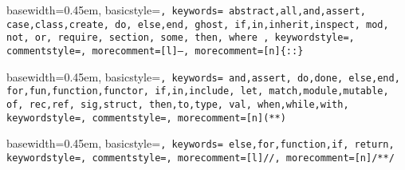 { basewidth=0.45em,
  basicstyle=\small\tt,
  keywords={
    abstract,all,and,assert,
    case,class,create,
    do,
    else,end,
    ghost,
    if,in,inherit,inspect,
    mod,
    not,
    or,
    require,
    section,
    some,
    then,
    where
  },
  keywordstyle=\color{blue},
  commentstyle=\color{brown},
  morecomment=[l]{--},
  morecomment=[n]{\{:}{:\}}
}

 {\lstset{language=alba}} {}







{ basewidth=0.45em,
  basicstyle=\tt\small,
  keywords={
    and,assert,
    do,done,
    else,end,
    for,fun,function,functor,
    if,in,include,
    let,
    match,module,mutable,
    of,
    rec,ref,
    sig,struct,
    then,to,type,
    val,
    when,while,with},
  keywordstyle=\color{blue},
  commentstyle=\color{brown},
  morecomment=[n]{(*}{*)}
}

 {\lstset{language=ocaml}} {}





{ basewidth=0.45em,
  basicstyle=\small\tt,
  keywords={
    else,for,function,if,
    return},
  keywordstyle=\color{blue},
  commentstyle=\color{brown},
  morecomment=[l]{//},
  morecomment=[n]{/*}{*/}
}

 {\lstset{language=js}} {}




\newcommand{\code}[1]{{\tt\small #1}}
\def\abold{\mathbf{a}}
\def\bbold{\mathbf{b}}
\def\Cbold{\mathbf{C}}
\def\fbold{\mathbf{f}}
\def\pbold{\mathbf{p}}
\def\tbold{\mathbf{t}}

\def\Any{{\cal{A}}}
\def\Prop{{\cal{P}}}

\def\case  {\text{case}}
\def\fix   {\text{fix}}
\def\ind   {\text{ind}}
\def\Inductive    {\mathbb{I}}
\def\Constructor  {\mathbb{C}}

\def\imp{\Rightarrow}
\def\reduce{\,\triangleright\,}
\def\reducestar{\,\triangleright^*\,}
\def\reduceplus{\,\triangleright^+\,}


\newcommand{\ruleh}[2]{\begin{array}{c} #1 \\ \hline #2\end{array}}
\newcommand{\rulev}[2]{\begin{array}{l} #1 \\ \hline #2\end{array}}

\theoremstyle{definition} \newtheorem{definition}{Definition}[section]
\theoremstyle{definition} \newtheorem{theorem}[definition]{Theorem}
\theoremstyle{definition} \newtheorem{lemma}[definition]{Lemma}



